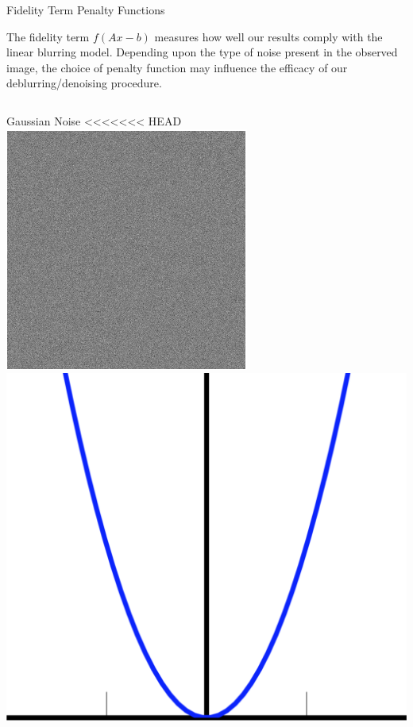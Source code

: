 \documentclass[12pt]{beamer}
\begin{document}
\begin{frame}{Fidelity Term Penalty Functions}

The fidelity term $f(Ax-b)$ measures how well our results comply with the linear blurring model. Depending upon the type of noise present in the observed image, the choice of penalty function may influence the efficacy of our deblurring/denoising procedure. 

\begin{columns}[T]
	\begin{column}{0.45\linewidth}
		\begin{block}{Gaussian Noise}
<<<<<<< HEAD
		\quad \includegraphics[scale=0.15]{../figures/gaussian_noise.png} \hspace{1.5em}
		\includegraphics[scale=0.1]{../figures/quadratic} \\

\end{block}
\end{column}
\end{columns}
\end{frame}
\end{document}
